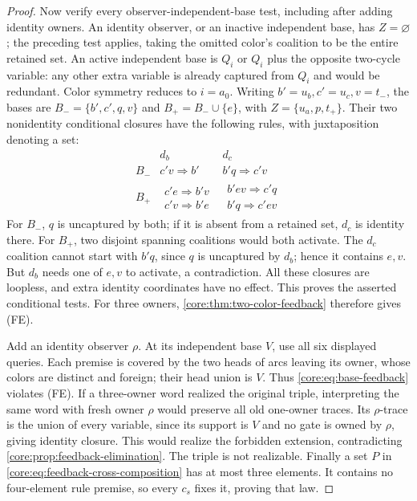 \begin{proof}
Now verify every observer-independent-base test, including after
adding identity owners. An identity observer, or an inactive independent
base, has $Z=\varnothing$; the preceding test applies, taking the
omitted color's coalition to be the entire retained set.
An active independent base is $Q_i$ or $Q_i$ plus the opposite
two-cycle variable: any other extra variable is already captured from
$Q_i$ and would be redundant. Color symmetry reduces to $i=a_0$.
Writing $b'=u_b,c'=u_c,v=t_-$, the bases are
$B_- =\{b',c',q,v\}$ and $B_+=B_-\cup\{e\}$, with
$Z=\{u_a,p,t_+\}$. Their two nonidentity conditional closures have the
following rules, with juxtaposition denoting a set:
\[
\begin{array}{c|l|l}
 &d_b&d_c\\\hline
 B_-&c'v\Rightarrow b'&b'q\Rightarrow c'v\\
 B_+&\begin{gathered}c'e\Rightarrow b'v\\c'v\Rightarrow b'e\end{gathered}
     &\begin{gathered}b'ev\Rightarrow c'q\\b'q\Rightarrow c'ev\end{gathered}
\end{array}
\]
For $B_-$, $q$ is uncaptured by both; if it is absent from a retained
set, $d_c$ is identity there. For $B_+$, two disjoint spanning
coalitions would both activate. The $d_c$ coalition cannot start with
$b'q$, since $q$ is uncaptured by $d_b$; hence it contains $e,v$.
But $d_b$ needs one of $e,v$ to activate, a contradiction. All these
closures are loopless, and extra identity coordinates have no effect.
This proves the asserted conditional tests. For three owners,
\cref{core:thm:two-color-feedback} therefore gives (FE).

Add an identity observer $\rho$. At its independent base $V$, use all
six displayed queries. Each premise is covered by the two heads of
arcs leaving its owner, whose colors are distinct and foreign; their
head union is $V$. Thus \eqref{core:eq:base-feedback} violates (FE).
If a three-owner word realized the original triple, interpreting the
same word with fresh owner $\rho$ would preserve all old one-owner
traces. Its $\rho$-trace is the union of every variable, since its
support is $V$ and no gate is owned by $\rho$, giving identity closure.
This would realize the forbidden extension, contradicting
\cref{core:prop:feedback-elimination}. The triple is not realizable.
Finally a set $P$ in \eqref{core:eq:feedback-cross-composition} has
at most three elements. It contains no four-element rule premise,
so every $c_s$ fixes it, proving that law.
\end{proof}

